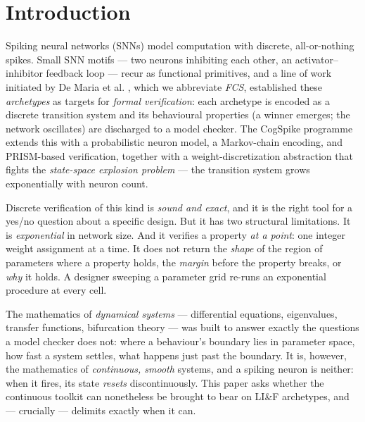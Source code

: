 \documentclass[conference]{IEEEtran}
\begin{document}
\section{Introduction}\label{sec:intro}

Spiking neural networks (SNNs) \cite{maass1997networks} model computation with
discrete, all-or-nothing spikes. Small SNN motifs --- two neurons inhibiting
each other, an activator--inhibitor feedback loop --- recur as functional
primitives, and a line of work initiated by De Maria et al.
\cite{DeMaria2020,naco20}, which we abbreviate \emph{FCS}, established these
\emph{archetypes} as targets for \emph{formal verification}: each archetype is
encoded as a discrete transition system and its behavioural properties (a
winner emerges; the network oscillates) are discharged to a model checker. The
CogSpike programme \cite{cogspike_wd} extends this with a probabilistic neuron
model, a Markov-chain encoding, and PRISM-based \cite{PRISM2011} verification,
together with a weight-discretization abstraction that fights the
\emph{state-space explosion problem} --- the transition system grows
exponentially with neuron count.

Discrete verification of this kind is \emph{sound and exact}, and it is the
right tool for a yes/no question about a specific design. But it has two
structural limitations. It is \emph{exponential} in network size. And it
verifies a property \emph{at a point}: one integer weight assignment at a time.
It does not return the \emph{shape} of the region of parameters where a
property holds, the \emph{margin} before the property breaks, or \emph{why} it
holds. A designer sweeping a parameter grid re-runs an exponential procedure at
every cell.

The mathematics of \emph{dynamical systems} --- differential equations,
eigenvalues, transfer functions, bifurcation theory --- was built to answer
exactly the questions a model checker does not: where a behaviour's boundary
lies in parameter space, how fast a system settles, what happens just past the
boundary. It is, however, the mathematics of \emph{continuous, smooth} systems,
and a spiking neuron is neither: when it fires, its state \emph{resets}
discontinuously. This paper asks whether the continuous toolkit can nonetheless
be brought to bear on LI\&F archetypes, and --- crucially --- delimits exactly
when it can.
\end{document}
